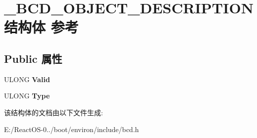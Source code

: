 \hypertarget{struct___b_c_d___o_b_j_e_c_t___d_e_s_c_r_i_p_t_i_o_n}{}\section{\+\_\+\+B\+C\+D\+\_\+\+O\+B\+J\+E\+C\+T\+\_\+\+D\+E\+S\+C\+R\+I\+P\+T\+I\+O\+N结构体 参考}
\label{struct___b_c_d___o_b_j_e_c_t___d_e_s_c_r_i_p_t_i_o_n}
\subsection*{Public 属性}
\begin{DoxyCompactItemize}
\item 
\mbox{\label{struct___b_c_d___o_b_j_e_c_t___d_e_s_c_r_i_p_t_i_o_n_a143e61e59d503d3538f870632e0db820}} 
U\+L\+O\+NG {\bfseries Valid}
\item 
\mbox{\label{struct___b_c_d___o_b_j_e_c_t___d_e_s_c_r_i_p_t_i_o_n_a7ff99464af4289098c18cb8976dc04ca}} 
U\+L\+O\+NG {\bfseries Type}
\end{DoxyCompactItemize}


该结构体的文档由以下文件生成\+:\begin{DoxyCompactItemize}
\item 
E\+:/\+React\+O\+S-\/0../boot/environ/include/bcd.\+h\end{DoxyCompactItemize}
